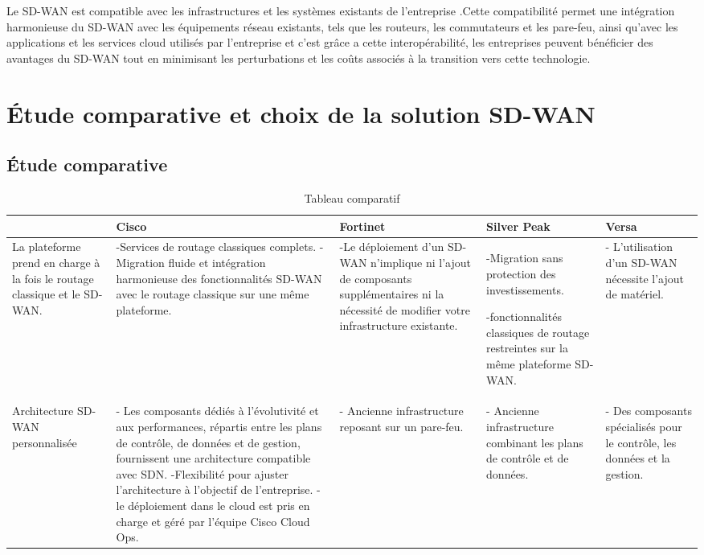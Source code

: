 Le SD-WAN est compatible avec les infrastructures et les systèmes existants de l'entreprise .Cette compatibilité permet une intégration harmonieuse du SD-WAN avec les équipements réseau existants, tels que les routeurs, les commutateurs et les pare-feu, ainsi qu'avec les applications et les services cloud utilisés par l'entreprise et c’est grâce a cette interopérabilité, les entreprises peuvent bénéficier des avantages du SD-WAN tout en minimisant les perturbations et les coûts associés à la transition vers cette technologie.

\section{Étude comparative et choix de la solution SD-WAN   }
\subsection{Étude comparative  }
\begin{table}[H]
\begin{center}
	\caption{Tableau comparatif  }
	
	\hspace*{-0.5 cm}	\begin{tabular}{|p{3cm}|p{3cm}|p{3cm}|p{3cm}|p{3cm}|}
		\hline
		\centering
	 & Cisco & Fortinet & Silver Peak & Versa\\
		\hline
		\centering
		
	La plateforme prend en charge à la fois le routage classique et le SD-WAN. & -Services de routage classiques complets.
	- Migration fluide et intégration harmonieuse des fonctionnalités SD-WAN avec le routage classique sur une même plateforme.
	& -Le déploiement d'un SD-WAN n'implique ni l'ajout de composants supplémentaires ni la nécessité de modifier votre infrastructure existante. & -Migration sans protection des investissements.
	
	-fonctionnalités classiques de routage restreintes sur la même plateforme SD-WAN.
	& - L'utilisation d'un SD-WAN nécessite l'ajout de matériel. \\
		
		\hline
		
		
		\centering
	Architecture SD-WAN personnalisée& - Les composants dédiés à l'évolutivité et aux performances, répartis entre les plans de contrôle, de données et de gestion, fournissent une architecture compatible avec SDN.
	-Flexibilité pour ajuster l'architecture à l'objectif de l'entreprise.
	- le déploiement dans le cloud est pris en charge et géré par l'équipe Cisco Cloud Ops.
	&- Ancienne infrastructure reposant sur un pare-feu.&- Ancienne infrastructure combinant les plans de contrôle et de données.&- Des composants spécialisés pour le contrôle, les données et la gestion.
		\\
		\hline
		\end{tabular}
\end{center}
\end{table}	
